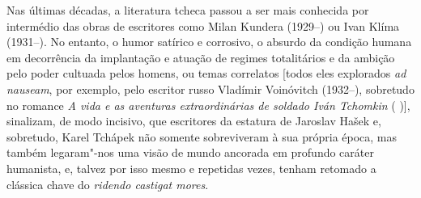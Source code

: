 Nas últimas décadas, a literatura tcheca passou a ser mais conhecida por
intermédio das obras de escritores como Milan Kundera (1929--) ou Ivan Klíma
(1931--). No entanto, o humor satírico e corrosivo, o absurdo da condição
humana em decorrência da implantação e atuação de regimes totalitários e  da
ambição pelo poder cultuada pelos homens, ou temas correlatos [todos eles
explorados \textit{ad nauseam}, por exemplo, pelo escritor russo Vladímir Voinóvitch
(1932--), sobretudo no romance \textit{A vida e as aventuras extraordinárias de
soldado Iván Tchomkin} ( 
  
 )], sinalizam, de modo incisivo,
que escritores da estatura de Jaroslav Hašek e, sobretudo, Karel Tchápek não
somente  sobreviveram à sua própria época, mas também legaram"-nos uma visão de
mundo ancorada em profundo caráter humanista, e, talvez por isso mesmo e
repetidas vezes, tenham retomado a clássica chave do \textit{ridendo castigat mores}.




